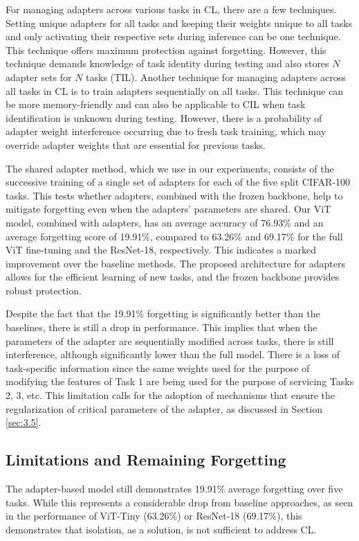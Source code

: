 \documentclass[english, LaM, oneside]{sapthesis}%
\numberwithin{equation}{chapter}
\begin{document}
For managing adapters across various tasks in CL, there are a few techniques. Setting unique adapters for all tasks and keeping their weights unique to all tasks and only activating their respective sets during inference can be one technique. This technique offers maximum protection against forgetting. However, this technique demands knowledge of task identity during testing and also stores $N$ adapter sets for $N$ tasks (TIL). Another technique for managing adapters across all tasks in CL is to train adapters sequentially on all tasks. This technique can be more memory-friendly and can also be applicable to CIL when task identification is unknown during testing\cite{18}. However, there is a probability of adapter weight interference occurring due to fresh task training, which may override adapter weights that are essential for previous tasks.

The shared adapter method, which we use in our experiments, consists of the successive training of a single set of adapters for each of the five split CIFAR-100 tasks. This tests whether adapters, combined with the frozen backbone, help to mitigate forgetting even when the adapters’ parameters are shared. Our ViT model, combined with adapters, has an average accuracy of 76.93\% and an average forgetting score of 19.91\%, compared to 63.26\% and 69.17\% for the full ViT fine-tuning and the ResNet-18, respectively. This indicates a marked improvement over the baseline methods. The proposed architecture for adapters allows for the efficient learning of new tasks, and the frozen backbone provides robust protection.

Despite the fact that the 19.91\% forgetting is significantly better than the baselines, there is still a drop in performance. This implies that when the parameters of the adapter are sequentially modified across tasks, there is still interference, although significantly lower than the full model. There is a loss of task-specific information since the same weights used for the purpose of modifying the features of Task 1 are being used for the purpose of servicing Tasks 2, 3, etc. This limitation calls for the adoption of mechanisms that ensure the regularization of critical parameters of the adapter, as discussed in Section \ref{sec:3.5}.

\subsection{Limitations and Remaining Forgetting }
\label{sec:3.4.4}
The adapter-based model still demonstrates 19.91\% average forgetting over five tasks. While this represents a considerable drop from baseline approaches, as seen in the performance of ViT-Tiny (63.26\%) or ResNet-18 (69.17\%), this demonstrates that isolation, as a solution, is not sufficient to address CL.
\end{document}
